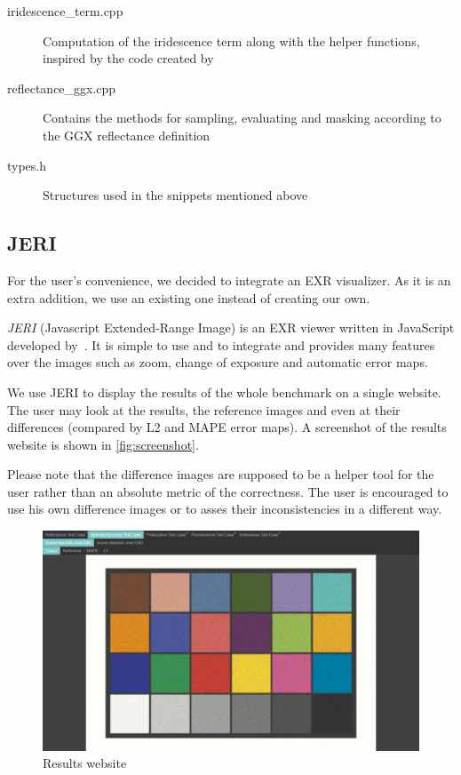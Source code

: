 \begin{description}
	\item[iridescence\_term.cpp] Computation of the iridescence term along with the helper functions, inspired by the code created by \citet{belcour2017practical}
	\item[reflectance\_ggx.cpp] Contains the methods for sampling, evaluating and masking according to the GGX reflectance definition~\cite{walter2007microfacet}
	\item[types.h] Structures used in the snippets mentioned above 
\end{description}

\subsection{JERI}

For the user's convenience, we decided to integrate an EXR visualizer. As it is an extra addition, we use an existing one instead of creating our own.

\emph{JERI} (Javascript Extended-Range Image) is an EXR viewer written in JavaScript developed by~\citet{jeriWeb}. It is simple to use and to integrate and provides many features over the images such as zoom, change of exposure and automatic error maps.

We use JERI to display the results of the whole benchmark on a single website. The user may look at the results, the reference images and even at their differences (compared by L2 and MAPE error maps). A screenshot of the results website is shown in \autoref{fig:screenshot}.

Please note that the difference images are supposed to be a helper tool for the user rather than an absolute metric of the correctness. The user is encouraged to use his own difference images or to asses their inconsistencies in a different way.

\begin{figure}
	\centering
	\includegraphics[width=\linewidth]{img/screenshot.png}
	\caption{Results website}
	\label{fig:screenshot}
\end{figure}

